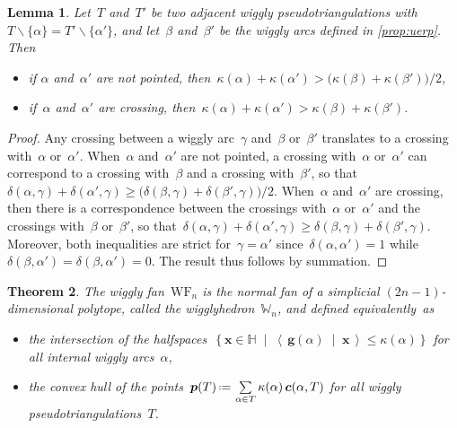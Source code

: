 \documentclass{amsart}
\newtheorem{theorem}{Theorem}%
\newtheorem{lemma}[theorem]{Lemma}
\theoremstyle{definition}
\newcommand{\HH}{\mathbb{H}} %
\renewcommand{\b}[1]{{\boldsymbol{#1}}} %
\newcommand{\set}[2]{\left\{ #1 \;\middle|\; #2 \right\}} %
\newcommand{\ssm}{\smallsetminus} %
\newcommand{\dotprod}[2]{\left\langle \, #1 \; \middle| \; #2 \, \right\rangle} %
\newcommand{\eqdef}{\mbox{\,\raisebox{0.2ex}{\scriptsize\ensuremath{\mathrm:}}\ensuremath{=}\,}} %
\newcommand{\darkblue}{\color{darkblue}} %
\newcommand{\defn}[1]{\textsl{\darkblue #1}} %
\newcommand{\polytope}[1]{\mathds{#1}} %
\newcommand{\wigglyFan}{\mathrm{WF}} %
\newcommand{\wigglyhedron}{\polytope{W}} %
\begin{document}
\begin{lemma}
\label{lem:wallCrossingInequalities}
Let~$T$ and~$T'$ be two adjacent wiggly pseudotriangulations with~$T \ssm \{\alpha\} = T' \ssm \{\alpha'\}$, and let~$\beta$ and~$\beta'$ be the wiggly arcs defined in \cref{prop:uerp}.
Then
\begin{itemize}
\item if $\alpha$ and~$\alpha'$ are not pointed, then~$\kappa(\alpha) + \kappa(\alpha') > \big( \kappa(\beta) + \kappa(\beta') \big) / 2$,
\item if~$\alpha$ and~$\alpha'$ are crossing, then~${\kappa(\alpha) + \kappa(\alpha') > \kappa(\beta) + \kappa(\beta')}$.
\end{itemize}
\end{lemma}

\begin{proof}
Any crossing between a wiggly arc~$\gamma$ and~$\beta$ or~$\beta'$ translates to a crossing with~$\alpha$ or~$\alpha'$.
When~$\alpha$ and~$\alpha'$ are not pointed, a crossing with~$\alpha$ or~$\alpha'$ can correspond to a crossing with~$\beta$ and a crossing with~$\beta'$, so that~$\delta(\alpha, \gamma) + \delta(\alpha', \gamma) \ge \big( \delta(\beta, \gamma) + \delta(\beta', \gamma) \big) / 2$.
When~$\alpha$ and~$\alpha'$ are crossing, then there is a correspondence between the crossings with~$\alpha$ or~$\alpha'$ and the crossings with~$\beta$ or~$\beta'$, so that~$\delta(\alpha, \gamma) + \delta(\alpha', \gamma) \ge \delta(\beta, \gamma) + \delta(\beta', \gamma)$.
Moreover, both inequalities are strict for~$\gamma = \alpha'$ since~$\delta(\alpha,\alpha') = 1$ while~$\delta(\beta, \alpha') = \delta(\beta, \alpha') = 0$.
The result thus follows by summation.
\end{proof}

\begin{theorem}
\label{thm:wigglyhedron}
The wiggly fan~$\wigglyFan_n$ is the normal fan of a simplicial $(2n-1)$-dimensional polytope, called the \defn{wigglyhedron}~$\wigglyhedron_n$, and defined equivalently~as
\begin{itemize}
\item the intersection of the halfspaces~$\set{\b{x} \in \HH}{\dotprod{\b{g}(\alpha)}{\b{x}} \le \kappa(\alpha)}$ for all internal wiggly arcs~$\alpha$,
\item the convex hull of the points~$\b{p}(T) \eqdef \sum\limits_{\alpha \in T} \kappa(\alpha) \, \b{c}(\alpha, T)$ for all wiggly pseudotriangulations~$T$.
\end{itemize}
\end{theorem}
\end{document}
